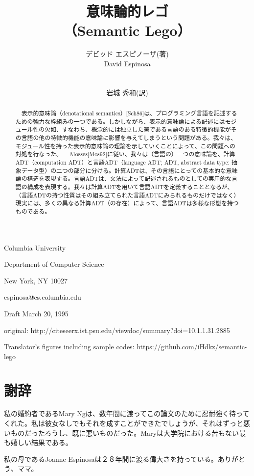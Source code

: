 \documentclass[11pt, oneside]{jsarticle}   	%
\title{意味論的レゴ \\
（Semantic Lego）
}
\author{デビッド エスピノーザ(著)\\
David Espinosa\\
\\
\begin{small}
岩城 秀和(訳)
\end{small}
}
\date{}							%
\begin{document}
\maketitle

\begin{center}
Columbia University

Department of Computer Science

New York, NY 10027

espinosa@cs.columbia.edu

Draft March 20, 1995


original: http://citeseerx.ist.psu.edu/viewdoc/summary?doi=10.1.1.31.2885
\end{center}

Translator's figures including sample codes: https://github.com/iHdkz/semantic-lego


\newpage
\begin{abstract}
　表示的意味論（denotational semantics）[Sch86]は、プログラミング言語を記述するための強力な枠組みの一つである。しかしながら、表示的意味論による記述にはモジュール性の欠如、すなわち、概念的には独立した筈である言語のある特徴的機能がその言語の他の特徴的機能の意味論に影響を与えてしまうという問題がある。我々は、モジュール性を持った表示的意味論の理論を示していくことによって、この問題への対処を行なった。
　Mosses[Mos92]に従い、我々は（言語の）一つの意味論を、計算ADT（computation ADT）と言語ADT（language ADT; ADT, abstract data type: 抽象データ型）の二つの部分に分ける。計算ADTは、その言語にとっての基本的な意味論の構造を表現する。言語ADTは、文法によって記述されるものとしての実用的な言語の構成を表現する。我々は計算ADTを用いて言語ADTを定義することとなるが、（言語ADTの持つ性質はその組み立てられた言語ADTにみられるものだけではなく）現実には、多くの異なる計算ADT（の存在）によって、言語ADTは多様な形態を持つものである。
\end{abstract}

\newpage
\tableofcontents

\section*{謝辞}
私の婚約者であるMary Ngは、数年間に渡ってこの論文のために忍耐強く待ってくれた。私は彼女なしでもそれを成すことができたでしょうが、それはずっと悪いものだったろうし、既に悪いものだった。Maryは大学院における苦もない最も嬉しい結果である。

私の母であるJoanne Espinosaは２８年間に渡る偉大さを持っている。ありがとう、ママ。
\end{document}
